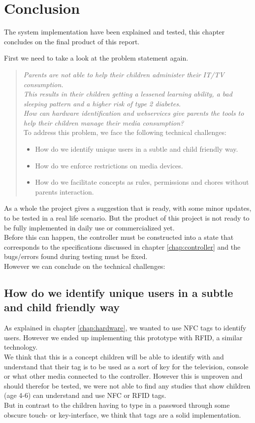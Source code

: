 \chapter{Conclusion}
The system implementation have been explained and tested, this chapter concludes on the final product of this report.

First we need to take a look at the problem statement again.
\begin{verse}
\textit{Parents are not able to help their children administer their IT/TV consumption.\\
This results in their children getting a lessened learning ability, a bad sleeping pattern and a higher risk of type 2 diabetes.\\
How can hardware identification and webservices give parents the tools to help their children manage their media consumption?}\\
To address this problem, we face the following technical challenges:
	\begin{itemize}
		\item How do we identify unique users in a subtle and child friendly way.
		\item How do we enforce restrictions on media devices.
		\item How do we facilitate concepts as rules, permissions and chores without parents interaction.
	\end{itemize}
\end{verse}

As a whole the project gives a suggestion that is ready, with some minor updates, to be tested in a real life scenario. But the product of this project is not ready to be fully implemented in daily use or commercialized yet.\\
Before this can happen, the controller must be constructed into a state that corresponds to the specifications discussed in chapter \vref{chap:controller} and the bugs/errors found during testing must be fixed.\\
\newpage
However we can conclude on the technical challenges:

\section*{How do we identify unique users in a subtle and child friendly way}
As explained in chapter \vref{chap:hardware}, we wanted to use NFC tags to identify users. However we ended up implementing this prototype with RFID, a similar technology.\\
We think that this is a concept children will be able to identify with and understand that their tag is to be used as a sort of key for the television, console or what other media connected to the controller. However this is unproven and should therefor be tested, we were not able to find any studies that show children (age 4-6) can understand and use NFC or RFID tags.\\
But in contrast to the children having to type in a password through some obscure touch- or key-interface, we think that tags are a solid implementation.

